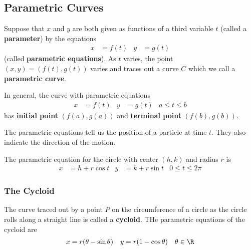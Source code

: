 \subsection{Parametric Curves}

Suppose that \(x\) and \(y\) are both given as functions of a third variable
\(t\) (called a \textbf{parameter}) by the equations
\begin{align*}
    x &= f(t) & y &= g(t)
\end{align*}
(called \textbf{parametric equations}).
As \(t\) varies, the point \((x,y)=(f(t),g(t))\) varies and traces out a curve
\(C\) which we call a \textbf{parametric curve}.

In general, the curve with parametric equations
\begin{align*}
    x &= f(t) & y &= g(t) & a\leq t\leq b
\end{align*}
has \textbf{initial point} \((f(a),g(a))\) and \textbf{terminal point}
\((f(b),g(b))\).

The parametric equations tell us the position of a particle at time \(t\).
They also indicate the direction of the motion.

The parametric equation for the circle with center \((h,k)\) and radius \(r\)
is
\begin{align*}
    x &= h+r\cos t & y &= k+r\sin t & 0\leq t\leq 2\pi
\end{align*}

\subsubsection*{The Cycloid}

The curve traced out by a point \(P\) on the circumference of a circle as the
circle rolls along a straight line is called a \textbf{cycloid}.
THe parametric equations of the cycloid are
\begin{align*}
    x &= r(\theta-\sin\theta) & y &= r(1-\cos\theta) & \theta\in\R
\end{align*}